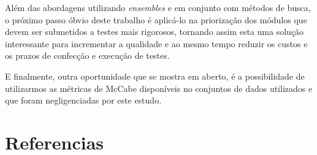 \documentclass[10pt]{article}
\begin{document}
    Além das abordagens utilizando \textit{ensembles} e em conjunto com métodos de busca, o próximo passo óbvio deste trabalho é aplicá-lo na priorização dos módulos que devem ser submetidos a testes mais rigorosos, tornando assim esta uma solução interessante para incrementar a qualidade e ao mesmo tempo reduzir os custos e os prazos de confecção e execução de testes.

    E finalmente, outra oportunidade que se mostra em aberto, é a possibilidade de utilizarmos as métricas de McCabe\cite{mccabe1976complexity} disponíveis no conjuntos de dados utilizados e que foram negligenciadas por este estudo.

\printnoidxglossary[type=acronym]
\printnoidxglossary[type=main]

\section{Referencias}

    
    \begingroup
        \renewcommand{\section}[2]{}%
        
    \endgroup
\end{document}
